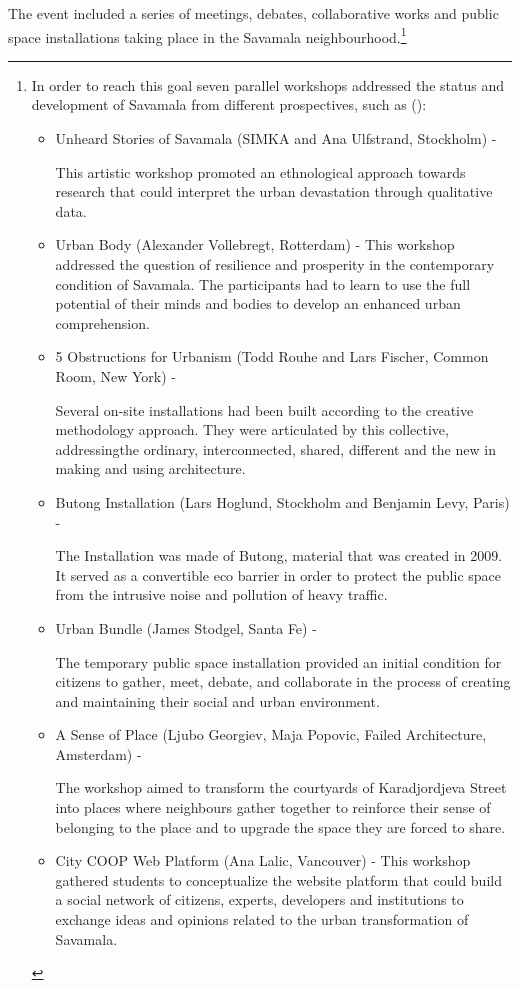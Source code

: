 \documentclass[11pt]{report}
\begin{document}
The event included a series of meetings, debates, collaborative works and public space installations taking place in the Savamala neighbourhood.\footnote{In order to reach this goal seven parallel workshops addressed the status and development of Savamala from different prospectives, such as (\href{Cvetinovic}{\citealt{cvetinovic_engine_2013}}):
\begin{itemize}

\item Unheard Stories of Savamala (SIMKA and Ana Ulfstrand, Stockholm) -

This artistic workshop promoted an ethnological approach towards research that could interpret the urban devastation through qualitative data. 

\item Urban Body (Alexander Vollebregt, Rotterdam) -
This workshop addressed the question of resilience and prosperity in the contemporary condition of Savamala. The participants had to learn to use the full potential of their minds and bodies to develop an enhanced urban comprehension.

\item 5 Obstructions for Urbanism (Todd Rouhe and Lars Fischer, Common Room, New York) -

Several on-site installations had been built according to the creative methodology approach. They were articulated by this collective, addressingthe  ordinary, interconnected, shared, different and the new in making and using architecture.

\item Butong Installation (Lars Hoglund, Stockholm and Benjamin Levy, Paris) - 

The Installation was made of Butong, material that was created in 2009. It served as a convertible eco barrier in order to protect the public space from the intrusive noise and pollution of heavy traffic.

\item Urban Bundle (James Stodgel, Santa Fe) -

The temporary public space installation provided an initial condition for citizens to gather, meet, debate, and collaborate in the process of creating and maintaining their social and urban environment.  

\item A Sense of Place (Ljubo Georgiev, Maja Popovic, Failed Architecture, Amsterdam) -

The workshop aimed to transform the courtyards of Karadjordjeva Street  into places where neighbours gather together to reinforce their sense of belonging to the place and to upgrade the space they are forced to share.

\item City COOP Web Platform (Ana Lalic, Vancouver) -
This workshop gathered students to conceptualize the website platform that could build a social network of citizens, experts, developers and institutions to exchange ideas and opinions related to the urban transformation of Savamala.  
\end{itemize}
}
\\
\end{document}
